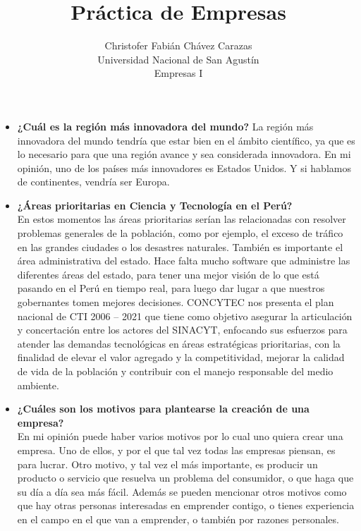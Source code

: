 \documentclass[a4paper,12pt]{article}
\begin{document}
\title{Práctica de Empresas}
  \author{
  Christofer Fabián Chávez Carazas \\
  \small{Universidad Nacional de San Agustín} \\
  \small{Empresas I}
}
\date{}

\maketitle


\begin{itemize}
 \item \textbf{¿Cuál es la región más innovadora del mundo?}
 La región más innovadora del mundo tendría que estar bien en el ámbito científico, ya que es lo necesario para que una
 región avance y sea considerada innovadora. En mi opinión, uno de los países más innovadores es Estados Unidos. Y si hablamos de continentes, vendría ser Europa.
 
 \item \textbf{¿Áreas prioritarias en Ciencia y Tecnología en el Perú?} \\
 En estos momentos las áreas prioritarias serían las relacionadas con resolver problemas generales de la población,
 como por ejemplo, el exceso de tráfico en las grandes ciudades o los desastres naturales. También es importante el área
 administrativa del estado. Hace falta mucho software que administre las diferentes áreas del estado, para tener una mejor
 visión de lo que está pasando en el Perú en tiempo real, para luego dar lugar a que nuestros gobernantes tomen mejores decisiones.
 CONCYTEC nos presenta el plan nacional  de CTI 2006 – 2021 que tiene como objetivo asegurar la articulación y concertación entre los
 actores del SINACYT, enfocando sus esfuerzos para atender las demandas tecnológicas en áreas estratégicas prioritarias, con la finalidad de 
 elevar el valor agregado y la competitividad, mejorar la calidad de vida de la población y contribuir con el manejo responsable del medio ambiente.
 
 \item \textbf{¿Cuáles son los motivos para plantearse la creación de una empresa?} \\
 En mi opinión puede haber varios motivos por lo cual uno quiera crear una empresa. Uno de ellos, y por el que tal vez todas las
 empresas piensan, es para lucrar. Otro motivo, y tal vez el más importante, es producir un producto o servicio que resuelva 
 un problema del consumidor, o que haga que su día a día sea más fácil. Además se pueden mencionar otros motivos como que hay otras
 personas interesadas en emprender contigo, o tienes experiencia en el campo en el que van a emprender, o también por razones personales.
 

\end{itemize}
\end{document}
